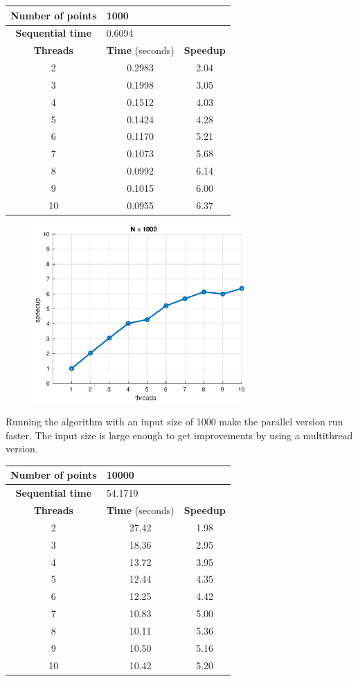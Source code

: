 \documentclass[10pt,twocolumn,letterpaper]{article}
\begin{document}
\begin{table}[H]
\begin{tabular}{c c c}
\hline
\textbf{Number of points} & \multicolumn{2}{l}{1000} \\
\hline
\textbf{Sequential time} & \multicolumn{2}{l}{0.6094} \\
\hline
\textbf{Threads} & \textbf{Time} (seconds) & \textbf{Speedup} \\
\hline
2 & 0.2983 & 2.04 \\
3 & 0.1998 & 3.05 \\
4 & 0.1512 & 4.03 \\
5 & 0.1424 & 4.28 \\
6 & 0.1170 & 5.21 \\
7 & 0.1073 & 5.68 \\
8 & 0.0992 & 6.14 \\
9 & 0.1015 & 6.00 \\
10 & 0.0955 & 6.37 \\
\end{tabular}
\end{table}

\begin{figure}[H]
\centering
\includegraphics[width=3.2in]{fig/speedup1000.eps}
\end{figure}

Running the algorithm with an input size of 1000 make the parallel version run faster. The input size is large enough to get improvements by using a multithread version.

\begin{table}[H]
\centering
\begin{tabular}{ccc}
\hline
\textbf{Number of points} & \multicolumn{2}{l}{10000} \\
\hline
\textbf{Sequential time} & \multicolumn{2}{l}{54.1719} \\
\hline
\textbf{Threads} & \textbf{Time} (seconds) & \textbf{Speedup} \\
\hline
2 & 27.42 & 1.98 \\
3 & 18.36 & 2.95 \\
4 & 13.72 & 3.95 \\
5 & 12.44 & 4.35 \\
6 & 12.25 & 4.42 \\
7 & 10.83 & 5.00 \\
8 & 10.11 & 5.36 \\
9 & 10.50 & 5.16 \\
10 & 10.42 & 5.20 \\
\hline
\end{tabular}
\end{table}
\end{document}
